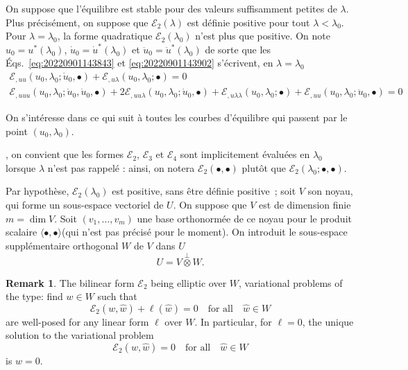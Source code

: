 \documentclass[12pt, final]{scrartcl}
\theoremstyle{definition}
\newtheorem{remark}{Remark}
\newcommand{\E}{\mathcal E}
\begin{document}
On suppose que l'équilibre est stable pour des valeurs suffisamment petites de
$\lambda$. Plus précisément, on suppose que $\E_2(\lambda)$ est définie positive pour tout
$\lambda < \lambda_0$. Pour $\lambda = \lambda_0$, la forme quadratique $\E_2(\lambda_0)$ n'est plus que
positive. On note $u_0 = u^{\ast}(\lambda_0)$, $\dot{u}_0 = \dot{u}^\ast(\lambda_0)$ et
$\ddot{u}_0 = \ddot{u}^\ast(\lambda_0)$ de sorte que les
Éqs.~\eqref{eq:20220901143843} et \eqref{eq:20220901143902} s'écrivent, en
$\lambda = \lambda_0$
\begin{gather}
  \label{eq:20220901144331}
  \E_{,uu}(u_0, \lambda_0; \dot{u}_0, \bullet) + \E_{,u\lambda}(u_0, \lambda_0; \bullet) = 0\\
  \label{eq:20220901144335}
  \E_{,uuu}(u_0, \lambda_0; \dot{u}_0, \dot{u}_0, \bullet) + 2\E_{,uu\lambda}(u_0, \lambda_0; \dot{u}_0, \bullet) + \E_{,u\lambda\lambda}(u_0, \lambda_0; \bullet) + \E_{,uu}(u_0, \lambda_0; \ddot{u}_0, \bullet) = 0
\end{gather}

On s'intéresse dans ce qui suit à toutes les courbes d'équilibre qui passent par
le point $(u_0, \lambda_0)$.

, on
convient que les formes $\E_2$, $\E_3$ et $\E_4$ sont implicitement évaluées en
$\lambda_0$ lorsque $\lambda$ n'est pas rappelé : ainsi, on notera $\E_2(•, •)$ plutôt
que $\E_2(\lambda_0 ; •, •)$.

Par hypothèse, $\E_2(\lambda_0)$ est positive, sans être définie
positive~; soit $V$ son noyau, qui forme un sous-espace vectoriel de $U$. On
suppose que $V$ est de dimension finie $m = \dim V$. Soit
$(v_1, \ldots, v_m)$ une base orthonormée de ce noyau pour le produit scalaire
$〈 •, • 〉$(qui n'est pas précisé pour le moment). On introduit le
sous-espace supplémentaire orthogonal $W$ de $V$ dans $U$
\begin{equation}
  U = V \overset{\perp}{\otimes} W.
\end{equation}

\begin{remark}
  \label{rem:20220902095055}
  The bilinear form $\E_2$ being elliptic over $W$, variational problems of the
  type: find $w \in W$ such that
  \begin{equation}
    \E_2(w, \hat{w})+\ell(\hat{w}) = 0 \quad \text{for all} \quad \hat{w} \in W
  \end{equation}
  are well-posed for any linear form $\ell$ over $W$. In particular, for
  $\ell=0$, the unique solution to the variational problem
  \begin{equation}
    \E_2(w, \hat{w}) = 0 \quad \text{for all} \quad \hat{w} \in W
  \end{equation}
  is $w = 0$.
\end{remark}
\end{document}
